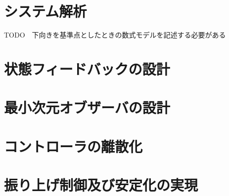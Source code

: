 \section{システム解析}
TODO　下向きを基準点としたときの数式モデルを記述する必要がある
\section{状態フィードバックの設計}
\section{最小次元オブザーバの設計}
\section{コントローラの離散化}
\section{振り上げ制御及び安定化の実現}